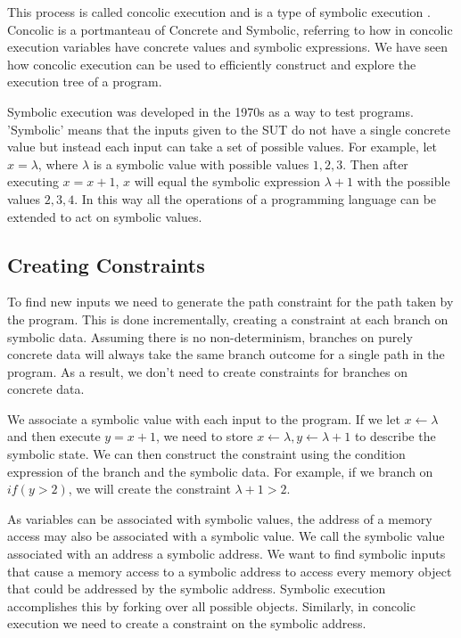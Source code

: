\documentclass[12pt,twoside]{report}
\begin{document}
This process is called concolic execution and is a type of symbolic execution \cite{217563}. Concolic is a portmanteau of Concrete and Symbolic, referring to how in concolic execution variables have concrete values and symbolic expressions. We have seen how concolic execution can be used to efficiently construct and explore the execution tree of a program. 

Symbolic execution was developed in the 1970s \cite{10.1145/800027.808444, 10.1145/360248.360252, 1702443, 10.1145/800027.808445} as a way to test programs. 'Symbolic' means that the inputs given to the SUT do not have a single concrete value but instead each input can take a set of possible values. For example, let $x = \lambda$, where $\lambda$ is a symbolic value with possible values $1,2,3$. Then after executing $x = x + 1$, $x$ will equal the symbolic expression $\lambda + 1$ with the possible values $2,3,4$. In this way all the operations of a programming language can be extended to act on symbolic values.

\subsection{Creating Constraints}
To find new inputs we need to generate the path constraint for the path taken by the program. This is done incrementally, creating a constraint at each branch on symbolic data. Assuming there is no non-determinism, branches on purely concrete data will always take the same branch outcome for a single path in the program. As a result, we don't need to create constraints for branches on concrete data.

We associate a symbolic value with each input to the program. If we let $x \leftarrow \lambda$ and then execute $y = x + 1$, we need to store $x \leftarrow \lambda, y \leftarrow \lambda + 1$ to describe the symbolic state. We can then construct the constraint using the condition expression of the branch and the symbolic data. For example, if we branch on $if(y > 2)$, we will create the constraint $\lambda + 1 > 2$.

As variables can be associated with symbolic values, the address of a memory access may also be associated with a symbolic value. We call the symbolic value associated with an address a symbolic address. We want to find symbolic inputs that cause a memory access to a symbolic address to access every memory object that could be addressed by the symbolic address. Symbolic execution accomplishes this by forking over all possible objects. Similarly, in concolic execution we need to create a constraint on the symbolic address.
\end{document}
